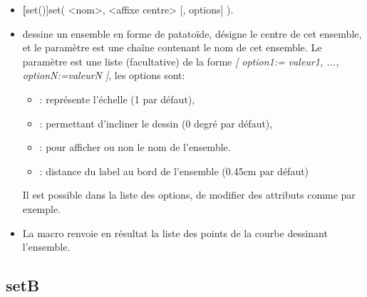\begin{itemize}
 \item \util \textbf[set()]{set( <nom>, <affixe centre> [, options] )}.
 \item \desc dessine un ensemble en forme de patatoïde,  désigne le centre de cet ensemble, et le paramètre  est une chaîne contenant le nom de cet ensemble. Le paramètre  est une liste (facultative) de la forme \textsl{[ option1:= valeur1, ..., optionN:=valeurN ]}, les options sont:

  \begin{itemize}
  \item {}: représente l'échelle (1 par défaut),
  \item {}: permettant d'incliner le dessin (0 degré par défaut),
  \item {}: pour afficher ou non le nom de l'ensemble.
  \item {}: distance du label au bord de l'ensemble (0.45cm par défaut)
  \end{itemize}
Il est possible dans la liste des options, de modifier des attributs comme  par exemple.
 \item La macro renvoie en résultat la liste des points de la courbe dessinant l'ensemble.
\end{itemize}

\subsection{setB}\label{macsetB}

